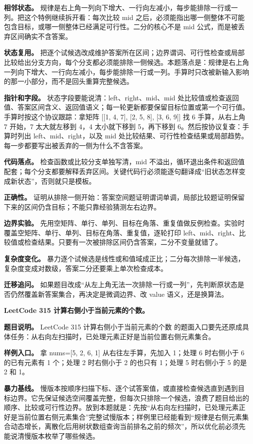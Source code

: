 \textbf{相邻状态。} 规律是右上角一列向下增大、一行向左减小，每步能排除一行或一列。把这个特例继续拆开看：每次比较 mid 之后，必须能指出哪一侧整体不可能包含目标，或哪一侧整体已经满足可行性。二分的核心不是 mid 公式，而是被丢弃区间确实不含答案。

\textbf{状态复用。} 把逐个试候选改成维护答案所在区间；边界谓词、可行性检查或局部比较给出分支方向，每个分支都必须能排除一侧候选。本题落点是：规律是右上角一列向下增大、一行向左减小，每步能排除一行或一列。手算时只改被新输入影响的那一小部分，而不是回头重算完整候选。

\textbf{指针和字段。} 状态字段要能说清：left、right、mid、mid 处比较值或检查返回值、答案区间含义、返回值语义；每一轮更新都要保留目标位置或第一个可行值。手算时按这个协议跟踪：拿矩阵 [[1, 4, 7], [2, 5, 8], [3, 6, 9]] 找 6 手算，从右上角 7 开始，7 太大就左移到 4，4 太小就下移到 5，再下移到 6。然后按协议复查：手算时列出 left、mid、right，以及 mid 处比较结果、可行性检查结果或局部趋势。每一步都要写出被丢弃的一侧为什么不含答案。

\textbf{代码落点。} 检查函数或比较分支单独写清，mid 不溢出，循环退出条件和返回值配套；每个分支都要解释丢弃区间。关键代码行必须能逐句翻译成“旧状态怎样变成新状态”，否则就只是模板。

\textbf{正确性。} 证明从排除一侧开始：答案空间题证明谓词单调，局部比较题证明保留下来的区间仍含目标；不能只靠经验猜测左右边界。

\textbf{边界实验。} 先用空矩阵、单行、单列、目标在角落、重复值做反例检查。实验时覆盖空矩阵、单行、单列、目标在角落、重复值，逐轮打印 left、mid、right、比较值或检查结果。只要有一次被排除区间仍含答案，二分不变量就错了。

\textbf{复杂度变化。} 暴力逐个试候选是线性或和值域成正比；二分每次排除一半候选，复杂度变成对数级，答案二分还要乘上单次检查成本。

\textbf{迁移追问。} 如果题目改成“从左上角无法一次排除一行或一列”，先判断原状态是否仍然覆盖新答案集合，再决定是微调边界、改 value 语义，还是换算法。

\noindent\textbf{LeetCode 315 计算右侧小于当前元素的个数。}

\textbf{题目说明。} LeetCode 315 计算右侧小于当前元素的个数 的题面入口要先还原成具体任务：从右向左扫描时，已处理元素正好是当前位置右侧元素集合。

\textbf{样例入口。} 拿 nums=[5, 2, 6, 1] 从右往左手算，先加入 1；处理 6 时右侧小于 6 的已有元素有 1 个；处理 2 时右侧小于 2 的也只有 1；处理 5 时右侧小于 5 的是 2 和 1。

\textbf{暴力基线。} 慢版本按顺序扫描下标、逐个试答案值，或直接检查候选直到遇到目标边界。它先保证候选空间覆盖完整，但每次只排除一个候选，浪费了题目给出的顺序、比较或可行性边界。放到本题就是：先按“从右向左扫描时，已处理元素正好是当前位置右侧元素集合”完整试慢版本；样例里已经能看到“规律是右侧元素集合动态增长，离散化后用树状数组查询当前排名之前的频次”，所以优化前必须先能说清慢版本枚举了哪些候选。

